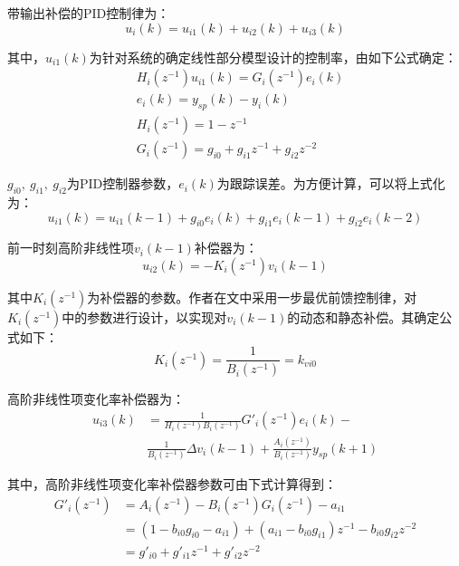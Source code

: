 \documentclass[UTF8, 12pt]{article}
\begin{document}
带输出补偿的PID控制律为：
\begin{equation*}
	u_i(k) = u_{i1}(k) + u_{i2}(k) + u_{i3}(k)
\end{equation*}

其中，$u_{i1}(k)$为针对系统的确定线性部分模型设计的控制率，由如下公式确定：
\begin{align*}
	& H_i(z^{-1})u_{i1}(k) = G_i(z^{-1})e_i(k) \\
	& e_i(k) = y_{sp}(k) - y_i(k) \\
	& H_i(z^{-1}) = 1 - z^{-1} \\
	& G_i(z^{-1}) = g_{i0} + g_{i1}z^{-1} + g_{i2}z^{-2}
\end{align*}

$g_{i0},\ g_{i1},\ g_{i2}$为PID控制器参数，$e_i(k)$为跟踪误差。为方便计算，可以将上式化为：
\begin{equation*}
	u_{i1}(k) = u_{i1}(k-1) + g_{i0}e_i(k) + g_{i1}e_i(k-1) + g_{i2}e_i(k-2) 
\end{equation*}

前一时刻高阶非线性项$v_i(k-1)$补偿器为：
\begin{equation*}
	u_{i2}(k) = -K_i(z^{-1})v_i(k-1)
\end{equation*}

其中$K_i(z^{-1})$为补偿器的参数。作者在文中采用一步最优前馈控制律，对$K_i(z^{-1})$中的参数进行设计，以实现对$v_i(k-1)$的动态和静态补偿。其确定公式如下：
\begin{equation*}
	K_i(z^{-1}) = \frac{1}{B_i(z^{-1})} = k_{vi0}
\end{equation*}

高阶非线性项变化率补偿器为：
\begin{align*}
	u_{i3}(k) &= \frac{1}{H_i(z^{-1})B_i(z^{-1})}G'_i(z^{-1})e_i(k) - \\
	& \frac{1}{B_i(z^{-1})}\Delta v_i(k-1) + \frac{A_i(z^{-1})}{B_i(z^{-1})}y_{sp}(k+1)
\end{align*}

其中，高阶非线性项变化率补偿器参数可由下式计算得到：
\begin{align*}
	G'_i(z^{-1}) &= A_i(z^{-1}) - B_i(z^{-1})G_i(z^{-1}) - a_{i1} \\
	&= (1 - b_{i0}g_{i0} - a_{i1}) + (a_{i1} - b_{i0}g_{i1})z^{-1} - b_{i0}g_{i2}z^{-2} \\
	&= g'_{i0} + g'_{i1}z^{-1} + g'_{i2}z^{-2}
\end{align*}

\end{document}
